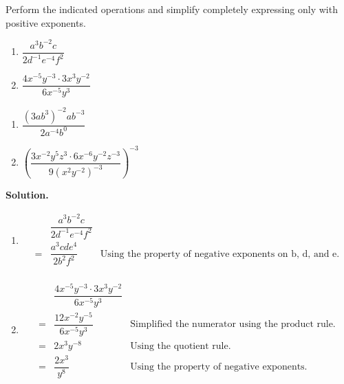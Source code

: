 \begin{ex} \label{exponentreview3}  Perform the indicated operations and simplify completely expressing only with positive
exponents.

\begin{multicols}{2}
\begin{enumerate}

\item $\dfrac{a^3 b^{- 2} c}{2 d^{- 1} e^{- 4} f^2}$
\item $\dfrac{4 x^{- 5} y^{- 3} \cdot 3 x^3 y^{- 2}}{6 x^{- 5} y^3}$

\setcounter{HW}{\value{enumi}}
\end{enumerate}
\end{multicols}

\begin{multicols}{2}
\begin{enumerate}

\setcounter{enumi}{\value{HW}}

\item $\dfrac{(3 {ab}^3)^{- 2} {ab}^{- 3}}{2 a^{- 4} b^0}$
\item $\left( \dfrac{3 x^{- 2} y^5 z^3 \cdot 6 x^{- 6} y^{- 2} z^{- 3}}{9 (x^2y^{- 2})^{- 3}} \right)^{- 3}$

\end{enumerate}
\end{multicols}

{\bf Solution.}

\begin{enumerate}

\item \[
\begin{array}{cll}
& \dfrac{a^3 b^{- 2} c}{2 d^{- 1} e^{- 4} f^2} & \\[8pt]
 = &  \dfrac{a^3 c d e^4}{2 b^2 f^2} &  \text{Using the property of negative exponents on b, d, and e.}\\
\end{array}
\]

\item \[
\begin{array}{cll}
& \dfrac{4 x^{- 5} y^{- 3} \cdot 3 x^3 y^{- 2}}{6 x^{- 5} y^3} & \\[8pt]
= & \dfrac{12 x^{- 2} y^{- 5}}{6 x^{- 5} y^3} &  \text{Simplified the numerator using the product rule.}\\[8pt]
= & 2 x^3 y^{- 8} & \text{Using the quotient rule.}\\[8pt]
= & \dfrac{2 x^3}{y^8} &  \text{Using the property of negative exponents.}
\end{array}
\]


\end{enumerate}
\end{ex}
